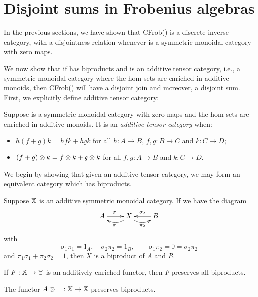 \section{Disjoint sums in Frobenius algebras}
\label{sec:disjoint-sums-in-frobenius-algebras}

In the previous sections, we have shown that CFrob(\X) is a discrete inverse category, with a
disjointness relation whenever \X is a symmetric monoidal category with zero maps.

We now show that if \X has biproducts and is an additive tensor category, i.e., a symmetric monoidal
category where the hom-sets are enriched in additive monoids, then CFrob(\X) will have a disjoint
join and moreover, a disjoint sum. First, we explicitly define additive tensor category:

\begin{definition}\label{def:additive-tensor-category}
  Suppose \X is a symmetric monoidal category with zero maps and the hom-sets are enriched in
  additive monoids. It is an \emph{additive tensor category}  when:
  \begin{itemize}
    \item $h(f+g)k = h f k + h g k$ for all $h:A\to B$, $f,g:B\to C$ and $k:C \to  D$;
    \item $(f+g)\otimes k = f\otimes k + g\otimes k$ for all $f,g:A\to B$ and  $k:C\to D$.
  \end{itemize}
\end{definition}

We begin by showing that given an additive tensor category, we may form an equivalent category which has
biproducts.

\begin{lemma}\label{lem:axb_is_a_biproduct}
  Suppose $\mathbb{X}$ is an additive symmetric monoidal category. If we have the diagram
  \[
      \xymatrix{
      A\ar[r]^{\sigma_1} &X\ar@/^9pt/[l]^{\pi_1} \ar@/_9pt/[r]_{\pi_2} & B \ar[l]_{\sigma_2}
    }
  \]
  with
  \[
    \sigma_1\pi_1 = 1_A,\quad\sigma_2\pi_2 = 1_B,\qquad \sigma_1\pi_2 = 0 = \sigma_2\pi_2
  \]
  and $\pi_1\sigma_1 + \pi_2\sigma_2 = 1$, then $X$ is a biproduct of $A$ and $B$.
\end{lemma}

\begin{corollary}\label{cor:functor_preserves_biproducts}
  If $F:\mathbb{X}\to\mathbb{Y}$ is an additively enriched functor, then $F$ preserves all biproducts.
\end{corollary}

\begin{corollary}\label{cor:tensor_preserves_biproducts}
  The functor $A\otimes\_:\mathbb{X} \to \mathbb{X}$ preserves biproducts.
\end{corollary}

